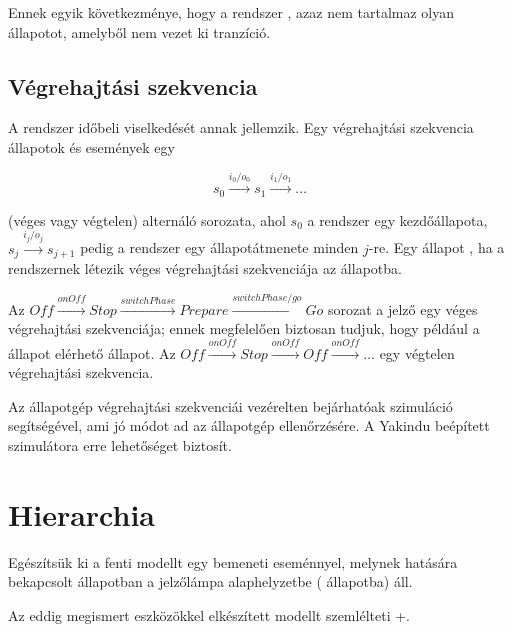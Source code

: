 \begin{megjegyzes}
	Ennek egyik következménye, hogy a rendszer , azaz nem tartalmaz olyan állapotot, amelyből nem vezet ki tranzíció.
\end{megjegyzes}

\subsection{Végrehajtási szekvencia}

A rendszer időbeli viselkedését annak  jellemzik. Egy végrehajtási szekvencia állapotok és események egy

$$s_0 \xrightarrow{i_0 / o_0} s_1 \xrightarrow{i_1 / o_1} \ldots$$

(véges vagy végtelen) alternáló sorozata, ahol $s_0$ a rendszer egy kezdőállapota, $s_j \xrightarrow{i_j / o_j} s_{j+1}$ pedig a rendszer egy állapotátmenete minden $j$-re. Egy állapot , ha a rendszernek létezik véges végrehajtási szekvenciája az állapotba.

\begin{pelda}
	Az $\mathit{Off} \xrightarrow{\mathit{onOff}} \mathit{Stop} \xrightarrow{\mathit{switchPhase}} \mathit{Prepare} \xrightarrow{\mathit{switchPhase} / \mathit{go}} \mathit{Go}$ sorozat a jelző egy véges végrehajtási szekvenciája; ennek megfelelően biztosan tudjuk, hogy például a  állapot elérhető állapot. Az $\mathit{Off} \xrightarrow{\mathit{onOff}} \mathit{Stop} \xrightarrow{\mathit{onOff}} \mathit{Off} \xrightarrow{\mathit{onOff}} \ldots$ egy végtelen végrehajtási szekvencia.
\end{pelda}

Az állapotgép végrehajtási szekvenciái vezérelten bejárhatóak szimuláció segítségével, ami jó módot ad az állapotgép ellenőrzésére. A Yakindu beépített szimulátora erre lehetőséget biztosít.

\section{Hierarchia}


\begin{pelda}
	Egészítsük ki a fenti modellt egy  bemeneti eseménnyel, melynek hatására bekapcsolt állapotban a jelzőlámpa alaphelyzetbe ( állapotba) áll.

	Az eddig megismert eszközökkel elkészített modellt szemlélteti \az+.
\end{pelda}

